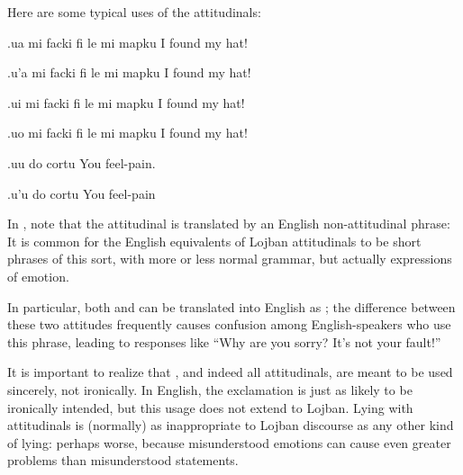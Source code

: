 Here are some typical uses of the  attitudinals:
\begin{example}
.ua mi facki fi le mi mapku\n
{} I found my hat!\n
{}
\end{example}

\begin{example}
.u'a mi facki fi le mi mapku\n
{} I found my hat!\n
{}
\end{example}

\begin{example}
.ui mi facki fi le mi mapku\n
{} I found my hat!\n
{}
\end{example}

\begin{example}
.uo mi facki fi le mi mapku\n
{} I found my hat!\n
{}
\end{example}

\begin{example}
.uu do cortu\n
{} You feel-pain.\n
{}
\end{example}

\begin{example}
.u'u do cortu\n
{} You feel-pain\n
{}
\end{example}

In , note that the attitudinal
     is translated by an English non-attitudinal phrase:
     It is common for the English equivalents of Lojban
    attitudinals to be short phrases of this sort, with more or
    less normal grammar, but actually expressions of emotion. 

In particular, both  and  can be translated
    into English as ; the difference between these two
    attitudes frequently causes confusion among English-speakers
    who use this phrase, leading to responses like ``Why are you
    sorry? It's not your fault!''

It is important to realize that , and indeed all
    attitudinals, are meant to be used sincerely, not ironically.
    In English, the exclamation  is just as likely to be
    ironically intended, but this usage does not extend to Lojban.
    Lying with attitudinals is (normally) as inappropriate to
    Lojban discourse as any other kind of lying: perhaps worse,
    because misunderstood emotions can cause even greater problems
    than misunderstood statements.

